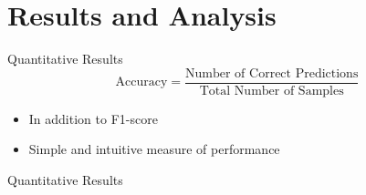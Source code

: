 \documentclass{beamer}
\begin{document}
\section{Results and Analysis}
\begin{frame}{Quantitative Results}
    \begin{equation}
        \text{Accuracy} = \frac{\text{Number of Correct Predictions}}{\text{Total Number of Samples}}\label{eq:accuracy}
    \end{equation}
    \vspace{0.5cm}

    \begin{itemize}
        \item In addition to F1-score
        \item Simple and intuitive measure of performance
    \end{itemize}
\end{frame}

\begin{frame}{Quantitative Results}
    \begin{table}
        \caption{Quantitative results of the models on the train, validation and test set.}
        \begin{center}
        \end{center}
    \end{table}
\end{frame}
\end{document}
